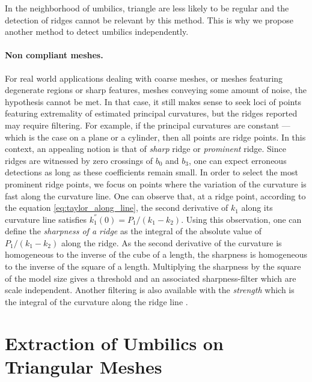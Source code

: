   In the neighborhood of umbilics,
triangle are less likely to be regular and the detection of ridges
cannot be relevant by this method.  This is why we propose another
method to detect umbilics independently.




\paragraph{Non compliant meshes.}
For real world applications dealing with coarse meshes, or meshes
featuring degenerate regions or sharp features, meshes conveying some
amount of noise, the hypothesis \cite{cgal:tr-cp-tdare-05} cannot be
met. In that case, it still makes sense to seek loci of points
featuring extremality of estimated principal curvatures, but the
ridges reported may require filtering. For example, if the principal
curvatures are constant ---which is the case on a plane or a cylinder,
then all points are ridge points. In this context, an appealing notion
is that of {\em sharp} ridge or {\em prominent} ridge. Since ridges
are witnessed by zero crossings of $b_0$ and $b_3$, one can expect
erroneous detections as long as these coefficients remain small. In
order to select the most prominent ridge points, we focus on points
where the variation of the curvature is fast along the curvature line.
One can observe that, at a ridge point, according to the equation
\ref{eq:taylor_along_line}, the second derivative of $k_1$ along its
curvature line satisfies $k_1^{''}(0) = P_1/(k_1-k_2)$.  Using this
observation, one can define the {\em sharpness of a ridge} as the
integral of the absolute value of $P_1/(k_1-k_2)$ along the ridge. As
the second derivative of the curvature is homogeneous to the inverse
of the cube of a length, the sharpness is homogeneous to the inverse
of the square of a length. Multiplying the sharpness by the square of
the model size gives a threshold and an associated sharpness-filter
which are scale independent. Another filtering is also available with
the {\em strength } which is the integral of the curvature along the
ridge line
\cite{cgal:yo-ab-hps-04}.





\section{Extraction of Umbilics on Triangular Meshes}
\label{umbilic-mesh}

